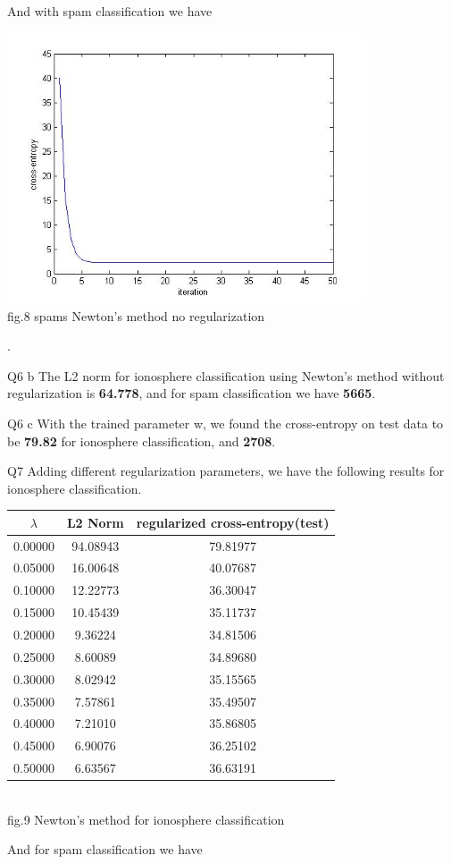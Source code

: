 \documentclass[12pt]{article}
\newenvironment{problem}[2][Problem]{\begin{trivlist}
\item[\hskip \labelsep {\bfseries #1}\hskip \labelsep {\bfseries #2}]}{\end{trivlist}}
\begin{document}
\begin{problem} {3.2 Newton's Method}
\begin{center}
\end{center}
And with spam classification we have
\begin{center}
		\includegraphics[height=8cm]{spams_newtons.jpg}{\\fig.8 spams Newton's method no regularization}
\end{center}.
\item{Q6 b}
	The L2 norm for ionosphere classification using Newton's method without regularization is \textbf{64.778}, and for spam classification we have \textbf{5665}.
\item{Q6 c}
	With the trained parameter w, we found the cross-entropy on test data to be \textbf{79.82} for ionosphere classification, and \textbf{2708}.
\item{Q7}
Adding different regularization parameters, we have the following results for ionosphere classification.
\begin{center}
	\begin{tabular}{||c c c||} 
		\hline
	   	$\lambda$ & L2 Norm  & regularized cross-entropy(test) \\
		\hline
	    0.00000 & 94.08943 & 79.81977\\
		\hline
	    0.05000 & 16.00648 & 40.07687\\
		\hline
	    0.10000 & 12.22773 & 36.30047\\
		\hline
	    0.15000 & 10.45439 & 35.11737\\
		\hline
	    0.20000 & 9.36224  & 34.81506\\
		\hline
	    0.25000 & 8.60089  & 34.89680\\
		\hline
	    0.30000 & 8.02942  & 35.15565\\
		\hline
	    0.35000 & 7.57861  & 35.49507\\
		\hline
	    0.40000 & 7.21010  & 35.86805\\
		\hline
	    0.45000 & 6.90076  & 36.25102\\
		\hline
	    0.50000 & 6.63567  & 36.63191\\
		\hline
	\end{tabular}
	{\\fig.9 Newton's method for ionosphere classification}
\end{center}
And for spam classification we have


\end{problem}
\end{document}

